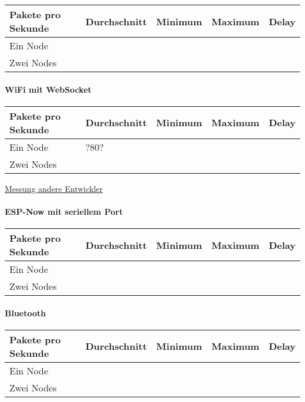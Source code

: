 \begin{longtable}[]{@{}lllll@{}}
\toprule()
Pakete pro Sekunde & Durchschnitt & Minimum & Maximum & Delay \\
\midrule()
\endhead
Ein Node & & & & \\
Zwei Nodes & & & & \\
\bottomrule()
\end{longtable}

\hypertarget{wifi-mit-websocket}{%
\paragraph{WiFi mit WebSocket}\label{wifi-mit-websocket}}

\begin{longtable}[]{@{}lllll@{}}
\toprule()
Pakete pro Sekunde & Durchschnitt & Minimum & Maximum & Delay \\
\midrule()
\endhead
Ein Node & ?80? & & & \\
Zwei Nodes & & & & \\
\bottomrule()
\end{longtable}

\href{https://github.com/Links2004/arduinoWebSockets/issues/21}{Messung
andere Entwickler}

\hypertarget{esp-now-mit-seriellem-port}{%
\paragraph{ESP-Now mit seriellem
Port}\label{esp-now-mit-seriellem-port}}

\begin{longtable}[]{@{}lllll@{}}
\toprule()
Pakete pro Sekunde & Durchschnitt & Minimum & Maximum & Delay \\
\midrule()
\endhead
Ein Node & & & & \\
Zwei Nodes & & & & \\
\bottomrule()
\end{longtable}

\hypertarget{bluetooth-1}{%
\paragraph{Bluetooth}\label{bluetooth-1}}

\begin{longtable}[]{@{}lllll@{}}
\toprule()
Pakete pro Sekunde & Durchschnitt & Minimum & Maximum & Delay \\
\midrule()
\endhead
Ein Node & & & & \\
Zwei Nodes & & & & \\
\bottomrule()
\end{longtable}

